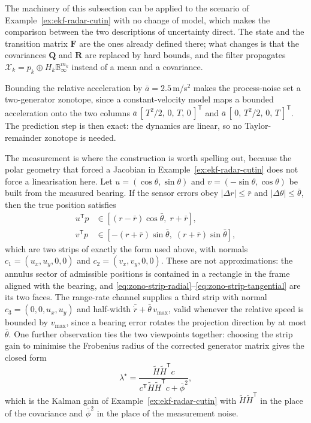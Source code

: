 \begin{example}
\label{ex:zono-radar-cutin}
The machinery of this subsection can be applied to the scenario of
Example~\ref{ex:ekf-radar-cutin} with no change of model, which makes the
comparison between the two descriptions of uncertainty direct. The state and
the transition matrix $\mathbf{F}$ are the ones already defined there; what
changes is that the covariances $\mathbf{Q}$ and $\mathbf{R}$ are replaced by
hard bounds, and the filter propagates $\mathcal{X}_k=p_k\oplus H_k\mathbb{B}_{\infty}^{m_k}$
instead of a mean and a covariance.

Bounding the relative acceleration by $\bar a=2.5$\,m/s$^{2}$ makes the
process-noise set a two-generator zonotope, since a constant-velocity model
maps a bounded acceleration onto the two columns
$\bar a\,[\,T^{2}/2,\,0,\,T,\,0\,]^{\mathsf T}$ and
$\bar a\,[\,0,\,T^{2}/2,\,0,\,T\,]^{\mathsf T}$. The prediction step is then
exact: the dynamics are linear, so no Taylor-remainder zonotope is needed.

The measurement is where the construction is worth spelling out, because the
polar geometry that forced a Jacobian in Example~\ref{ex:ekf-radar-cutin} does
not force a linearisation here. Let $u=(\cos\theta,\sin\theta)$ and
$v=(-\sin\theta,\cos\theta)$ be built from the measured bearing. If the sensor
errors obey $|\Delta r|\le\bar r$ and $|\Delta\theta|\le\bar\theta$, then the
true position satisfies
\begin{align}
u^{\mathsf T}p &\in \left[(r-\bar r)\cos\bar\theta,\; r+\bar r\right],
\label{eq:zono-strip-radial}\\
v^{\mathsf T}p &\in \left[-(r+\bar r)\sin\bar\theta,\; (r+\bar r)\sin\bar\theta\right],
\label{eq:zono-strip-tangential}
\end{align}
which are two strips of exactly the form used above, with normals
$c_{1}=(u_x,u_y,0,0)$ and $c_{2}=(v_x,v_y,0,0)$. These are not approximations:
the annulus sector of admissible positions is contained in a rectangle in the
frame aligned with the bearing, and \eqref{eq:zono-strip-radial}--\eqref{eq:zono-strip-tangential}
are its two faces. The range-rate channel supplies a third strip with normal
$c_{3}=(0,0,u_x,u_y)$ and half-width $\bar{\dot r}+\bar\theta\,v_{\max}$, valid
whenever the relative speed is bounded by $v_{\max}$, since a bearing error
rotates the projection direction by at most $\bar\theta$. One further
observation ties the two viewpoints together: choosing the strip gain to
minimise the Frobenius radius of the corrected generator matrix gives the
closed form
\begin{equation}
\lambda^{\star}=\frac{\widetilde H\widetilde H^{\mathsf T}c}
{c^{\mathsf T}\widetilde H\widetilde H^{\mathsf T}c+\bar\phi^{2}},
\label{eq:zono-optimal-gain}
\end{equation}
which is the Kalman gain of Example~\ref{ex:ekf-radar-cutin} with
$\widetilde H\widetilde H^{\mathsf T}$ in the place of the covariance and
$\bar\phi^{2}$ in the place of the measurement noise.


\end{example}
